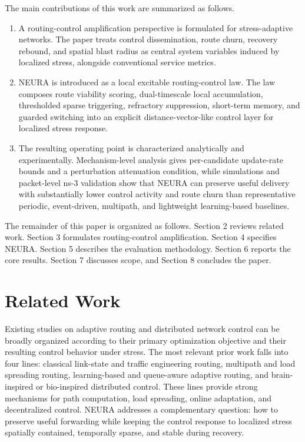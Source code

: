 \documentclass[5p,times]{elsarticle}
\begin{document}
The main contributions of this work are summarized as follows.
\begin{enumerate}
\item A routing-control amplification perspective is formulated for stress-adaptive networks. The paper treats control dissemination, route churn, recovery rebound, and spatial blast radius as central system variables induced by localized stress, alongside conventional service metrics.
\item NEURA is introduced as a local excitable routing-control law. The law composes route viability scoring, dual-timescale local accumulation, thresholded sparse triggering, refractory suppression, short-term memory, and guarded switching into an explicit distance-vector-like control layer for localized stress response.
\item The resulting operating point is characterized analytically and experimentally. Mechanism-level analysis gives per-candidate update-rate bounds and a perturbation attenuation condition, while simulations and packet-level ns-3 validation show that NEURA can preserve useful delivery with substantially lower control activity and route churn than representative periodic, event-driven, multipath, and lightweight learning-based baselines.
\end{enumerate}

The remainder of this paper is organized as follows. Section 2 reviews related work. Section 3 formulates routing-control amplification. Section 4 specifies NEURA. Section 5 describes the evaluation methodology. Section 6 reports the core results. Section 7 discusses scope, and Section 8 concludes the paper.

\section{Related Work}

Existing studies on adaptive routing and distributed network control can be broadly organized according to their primary optimization objective and their resulting control behavior under stress. The most relevant prior work falls into four lines: classical link-state and traffic engineering routing, multipath and load spreading routing, learning-based and queue-aware adaptive routing, and brain-inspired or bio-inspired distributed control. These lines provide strong mechanisms for path computation, load spreading, online adaptation, and decentralized control. NEURA addresses a complementary question: how to preserve useful forwarding while keeping the control response to localized stress spatially contained, temporally sparse, and stable during recovery.
\end{document}
